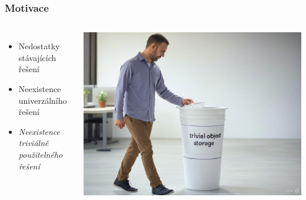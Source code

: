 \begin{frame}
  \frametitle{Motivace}
  \begin{columns}
    \begin{itemize}
        \item Nedostatky stávajících řešení
        \item Neexistence univerzálního řešení
        \item \emph{Neexistence triviálně použitelného řešení}
    \end{itemize}
     
    \includegraphics[width=\textwidth]{img/trivial-solution-2.jpg}
  \end{columns}
\end{frame}






